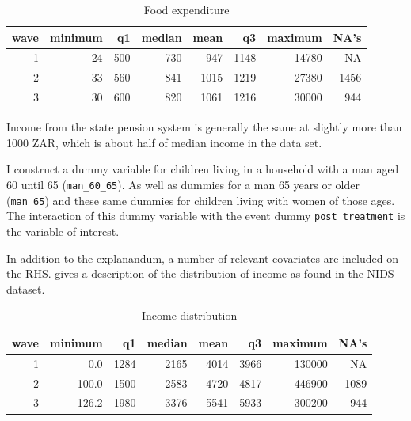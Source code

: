 \documentclass[a4paper,british]{article}\usepackage[]{graphicx}\usepackage[]{color}
\newenvironment{knitrout}{}{} %
\newcommand{\code}[1]{\texttt{#1}}
\begin{document}
\begin{table}[bh]
\begin{centering}
\caption{Food expenditure }
\label{tab:expf_descr}
\par\end{centering}
\begin{knitrout}
\color{fgcolor}


\begin{tabular}{r|r|r|r|r|r|r|r}
\hline
wave & minimum & q1 & median & mean & q3 & maximum & NA's\\
\hline
1 & 24 & 500 & 730 & 947 & 1148 & 14780 & NA\\
\hline
2 & 33 & 560 & 841 & 1015 & 1219 & 27380 & 1456\\
\hline
3 & 30 & 600 & 820 & 1061 & 1216 & 30000 & 944\\
\hline
\end{tabular}
\end{knitrout}
\end{table}

Income from the state pension system is generally the same at slightly
more than 1000 ZAR, which is about half of median income in the data
set.

I construct a dummy variable for children living in a household with
a man aged 60 until 65 (\code{man\_60\_65}). As well as dummies for
a man 65 years or older (\code{man\_65}) and these same dummies for
children living with women of those ages. The interaction of this
dummy variable with the event dummy \code{post\_treatment} is the
variable of interest.

In addition to the explanandum, a number of relevant covariates are
included on the RHS.  gives a description of the distribution
of income as found in the NIDS dataset.

\begin{table}[hb!]
\begin{centering}
\caption{Income distribution}
\label{tab:income}
\par\end{centering}
\begin{knitrout}
\color{fgcolor}


\begin{tabular}{r|r|r|r|r|r|r|r}
\hline
wave & minimum & q1 & median & mean & q3 & maximum & NA's\\
\hline
1 & 0.0 & 1284 & 2165 & 4014 & 3966 & 130000 & NA\\
\hline
2 & 100.0 & 1500 & 2583 & 4720 & 4817 & 446900 & 1089\\
\hline
3 & 126.2 & 1980 & 3376 & 5541 & 5933 & 300200 & 944\\
\hline
\end{tabular}
\end{knitrout}
\end{table}
\end{document}
